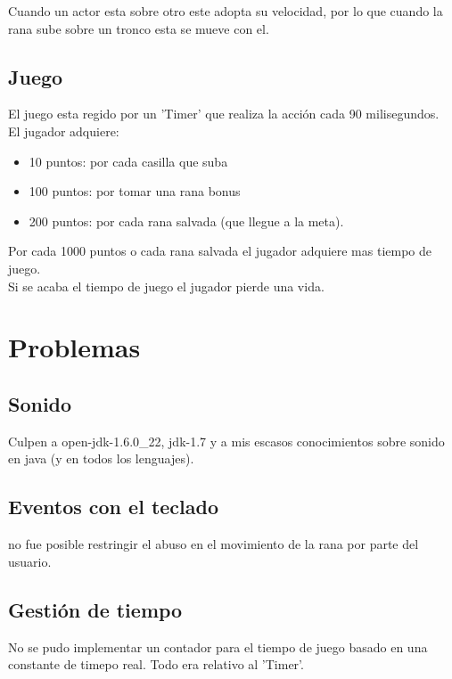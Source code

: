 \documentclass[letter, 12pt] {article}
\begin{document}
Cuando un actor esta sobre otro este adopta su velocidad, por lo
que cuando la rana sube sobre un tronco esta se mueve con el.

\newpage

\subsection* {Juego}
El juego esta regido por un 'Timer' que realiza la acción cada 90
milisegundos.\\

El jugador adquiere: 
\begin {itemize}
  \item 10 puntos: por cada casilla que suba
  \item 100 puntos: por tomar una rana bonus
  \item 200 puntos: por cada rana salvada (que llegue a la meta).
\end {itemize}

Por cada 1000 puntos o cada rana salvada el jugador adquiere mas 
tiempo de juego. \\

Si se acaba el tiempo de juego el jugador pierde una vida. \\

\section* {Problemas}
\subsection* {Sonido}
Culpen a open-jdk-1.6.0\_22, jdk-1.7 y a mis escasos conocimientos
sobre sonido en java (y en todos los lenguajes).

\subsection* {Eventos con el teclado}
no fue posible restringir el abuso en el movimiento de la rana por
parte del usuario.

\subsection* {Gestión de tiempo}
No se pudo implementar un contador para el tiempo de juego basado en
una constante de timepo real. Todo era relativo al 'Timer'.
\end{document}
